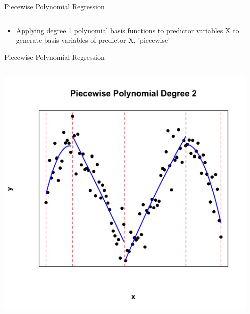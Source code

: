 \documentclass[english]{beamer}
\newcommand{\alertblue}[1]{{\color{blue}#1}}
\begin{document}
\begin{frame}{Piecewise Polynomial Regression}
\begin{columns}
\begin{column}{0.5\textwidth}
          \end{column}      
    \end{columns}
    \begin{itemize}
        \item Applying \alertblue{degree 1 polynomial basis functions} to predictor variables X to generate \alertblue{basis variables of predictor X, 'piecewise'}
    \end{itemize}
\end{frame}
\begin{frame}{Piecewise Polynomial Regression}
    
    \begin{columns}
        \begin{column}{0.47\textwidth}
            \centering
            \includegraphics[width=\linewidth]{images/piecewise_degree_2.jpeg} 
        \end{column}
        \begin{column}{0.47\textwidth}
            \centering

\end{column}
\end{columns}
\end{frame}
\end{document}
